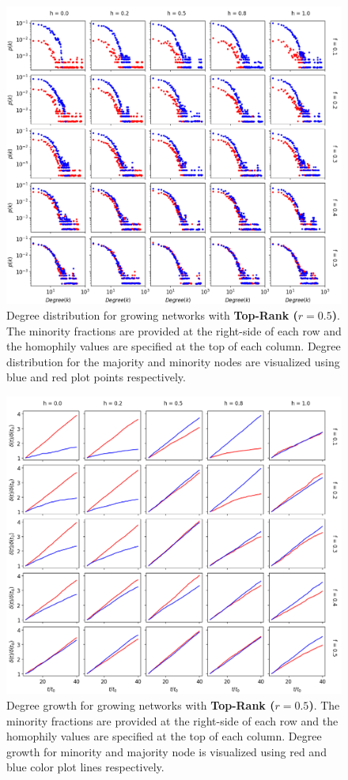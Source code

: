 \begin{appendices}
\begin{figure}[h!]
	\centering
	\includegraphics[width=1.0\textwidth]{images/dd_growth_top05.png}
	\caption{Degree distribution for growing networks with \textbf{Top-Rank ($r = 0.5$)}. The minority fractions are provided at the right-side of each row and the homophily values are specified at the top of each column. Degree distribution for the majority and minority nodes are visualized using blue and red plot points respectively.}
	\label{dd_growth_top05_fig}
\end{figure}

\begin{figure}[h!]
	\centering
	\includegraphics[width=1.0\textwidth]{images/dg_growth_top05.png}
	\caption{Degree growth for growing networks with \textbf{Top-Rank ($r = 0.5$)}. The minority fractions are provided at the right-side of each row and the homophily values are specified at the top of each column. Degree growth for minority and majority node is visualized using red and blue color plot lines respectively.}
	\label{dg_growth_top05_fig}
\end{figure}


\end{appendices}
